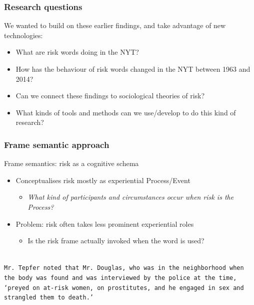 \documentclass{beamer}       %
\begin{document}
\begin{frame}
    \frametitle{Research questions}

    We wanted to build on these earlier findings, and take advantage of new technologies:

    \begin{itemize}
        \item What are risk words doing in the NYT?
        \item How has the behaviour of risk words changed in the NYT between 1963 and 2014?
        \item Can we connect these findings to sociological theories of risk?
        \item What kinds of tools and methods can we use\slash develop to do this kind of research?
    \end{itemize}
\end{frame}


\begin{frame}
    \frametitle{Frame semantic approach}

    Frame semantics: risk as a cognitive schema \cite{fillmore_toward_1992}

\begin{itemize}
    \item Conceptualises risk mostly as experiential Process\slash Event
    \begin{itemize}
        \item \emph{What kind of participants and circumstances occur when risk is the Process?}
    \end{itemize}
    \item Problem: risk often takes less prominent experiential roles
    \begin{itemize}
        \item Is the risk frame actually invoked when the word is used?
    \end{itemize}
    \end{itemize}

    ~\\
    \texttt{Mr. Tepfer noted that Mr. Douglas, who was in the neighborhood when the body was found and was interviewed by the police at the time, `preyed on \textbf{at-risk women}, on prostitutes, and he engaged in sex and strangled them to death.' }

\end{frame}
\end{document}
